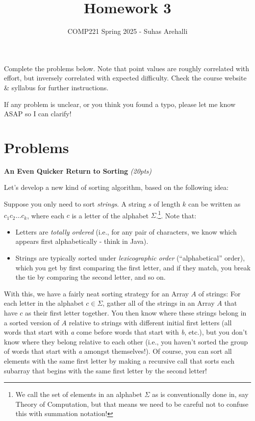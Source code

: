 \documentclass{exam}
\title{Homework 3}
\author{COMP221 Spring 2025 - Suhas Arehalli}
\date{}
\begin{document}
\maketitle

Complete the problems below. Note that point values are roughly correlated with effort, but inversely correlated with expected difficulty. Check the course website \& syllabus for further instructions.

If any problem is unclear, or you think you found a typo, please let me know ASAP so I can clarify!

\section*{Problems}

\begin{questions}
    \question \textbf{An Even Quicker Return to Sorting} \textit{(20pts)}
    
    Let's develop a new kind of sorting algorithm, based on the following idea:

    Suppose you only need to sort \textit{strings}. A string $s$ of length $k$ can be written as $c_1c_2 \dots c_k$, where each $c$ is a letter of the alphabet $\Sigma$.\footnote{We call the set of elements in an alphabet $\Sigma$ as is conventionally done in, say Theory of Computation, but that means we need to be careful not to confuse this with summation notation!}. Note that: 
    \begin{itemize}
        \item Letters are \textit{totally ordered} (i.e., for any pair of characters, we know which appears first alphabetically - think  in Java).
        \item Strings are typically sorted under \textit{lexicographic order} (``alphabetical'' order), which you get by first comparing the first letter, and if they match, you break the tie by comparing the second letter, and so on.
    \end{itemize}
    With this, we have a fairly neat sorting strategy for an Array $A$ of strings: For each letter in the alphabet $c \in \Sigma$, gather all of the strings in an Array $A$ that have $c$ as their first letter together. You then know where these strings belong in a sorted version of $A$ relative to strings with different initial first letters (all words that start with \textit{a} come before words that start with \textit{b}, etc.), but you don't know where they belong relative to each other (i.e., you haven't sorted the group of words that start with \textit{a} amongst themselves!). Of course, you can sort all elements with the same first letter by making a recursive call that sorts each subarray that begins with the same first letter by the second letter!


\end{questions}
\end{document}
